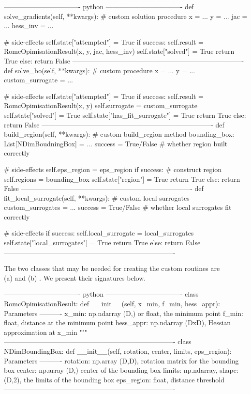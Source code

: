 \begin{Code}
---------------------------------- python ----------------------------------
def solve_gradients(self, **kwargs):
  # custom solution procedure
  x = ...
  y = ...
  jac = ...
  hess_inv = ...
  
  # side-effects
  self.state["attempted"] = True
  if success:
    self.result = RomcOpimisationResult(x, y, jac, hess_inv)
    self.state["solved"] = True
    return True
  else:
    return False
----------------------------------------------------------------------------
def solve_bo(self, **kwargs):
  # custom procedure
  x = ...
  y = ...
  custom_surrogate = ...
  
  # side-effects
  self.state["attempted"] = True
  if success:
    self.result = RomcOpimisationResult(x, y)
    self.surrogate = custom_surrogate
    self.state["solved"] = True
    self.state["has_fit_surrogate"] = True
    return True
  else:
    return False
----------------------------------------------------------------------------
def build_region(self, **kwargs):
  # custom build_region method
  bounding_box: List[NDimBoudningBox] = ...
  success = True/False # whether region built correctly

  # side-effects
  self.eps_region = eps_region
  if success:
    # construct region
    self.regions = bounding_box
    self.state["region"] = True
    return True
  else:
    return False
----------------------------------------------------------------------------
def fit_local_surrogate(self, **kwargs):
  # custom local surrogates
  custom_surrogates = ...
  success = True/False # whether local surrogates fit correctly

  # side-effects
  if success:
    self.local_surrogate = local_surrogates
    self.state["local_surrogates"] = True
    return True
  else:
    return False
----------------------------------------------------------------------------    
\end{Code}

The two classes that may be needed for creating the custom routines
are \\ (a)  and (b)
. We present their signatures below.

\begin{Code}
---------------------------------- python ----------------------------------
class RomcOpimisationResult:
    def __init__(self, x_min, f_min, hess_appr):
        Parameters
        ----------
        x_min: np.ndarray (D,) or float, the minimum point
        f_min: float, distance at the minimum point
        hess_appr: np.ndarray (DxD), Hessian approximation at x_min
        """
----------------------------------------------------------------------------    
class NDimBoundingBox:
    def __init__(self, rotation, center, limits, eps_region):
        Parameters
        ----------
        rotation: np.array (D,D),  rotation matrix for the bounding box
        center: np.array (D,) center of the bounding box
        limits: np.ndarray, shape: (D,2), the limits of the bounding box
        eps_region: float, distance threshold 
----------------------------------------------------------------------------    
\end{Code}
